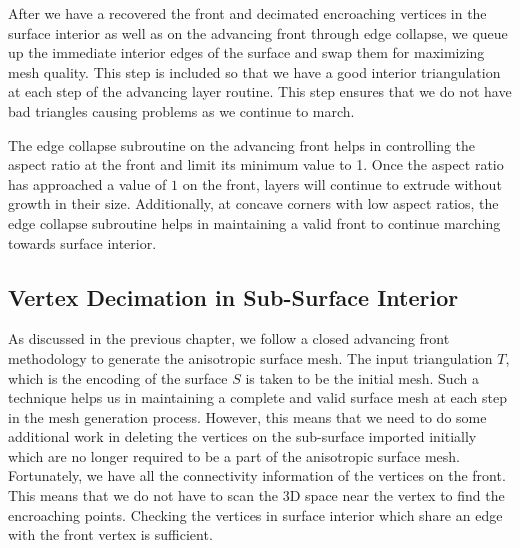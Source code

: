 After we have a recovered the front and decimated encroaching vertices in the surface interior as well as on the advancing front through edge collapse, we queue up the immediate interior edges of the surface and swap them for maximizing mesh quality. This step is included so that we have a good interior triangulation at each step of the advancing layer routine. This step ensures that we do not have bad triangles causing problems as we continue to march.

The edge collapse subroutine on the advancing front helps in controlling the aspect ratio at the front and limit its minimum value to 1. Once the aspect ratio has approached a value of $1$ on the front, layers will continue to extrude without growth in their size. Additionally, at concave corners with low aspect ratios, the edge collapse subroutine helps in maintaining a valid front to continue marching towards surface interior.

\subsection{Vertex Decimation in Sub-Surface Interior}

As discussed in the previous chapter, we follow a closed advancing front methodology to generate the anisotropic surface mesh. The input triangulation $T$, which is the encoding of the surface $S$ is taken to be the initial mesh. Such a technique helps us in maintaining a complete and valid surface mesh at each step in the mesh generation process. However, this means that we need to do some additional work in deleting the vertices on the sub-surface imported initially which are no longer required to be a part of the anisotropic surface mesh. Fortunately, we have all the connectivity information of the vertices on the front. This means that we do not have to scan the 3D space near the vertex to find the encroaching points. Checking the vertices in surface interior which share an edge with the front vertex is sufficient.

